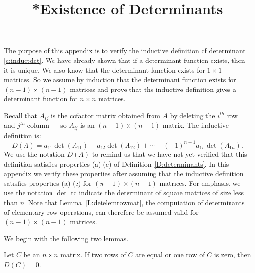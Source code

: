 \documentclass{ximera}
\title{*Existence of Determinants}
\begin{document}
\begin{abstract}
\end{abstract}
\maketitle


\label{A:det}

The purpose of this appendix is to verify the inductive
definition of determinant \eqref{e:inductdet}. We have already
shown that if a determinant function exists, then it is unique.
We also know that the determinant function exists for $1\times
1$ matrices. So we assume by induction that the determinant function
exists for $(n-1)\times(n-1)$ matrices and prove that the
inductive definition gives a determinant function for $n\times
n$ matrices.  

Recall that $A_{ij}$ is the cofactor matrix obtained from $A$ by
deleting the $i^{th}$ row and $j^{th}$ column --- so $A_{ij}$ is
an $(n-1)\times(n-1)$ matrix.  The inductive definition is:
  
\[
D(A) = a_{11}\det(A_{11})-a_{12}\det(A_{12})+\cdots 
+(-1)^{n+1}a_{1n}\det(A_{1n}).
\]
We use the notation $D(A)$ to remind us that we have not yet
verified that this definition satisfies properties (a)-(c) of
Definition~\ref{D:determinants}.  In this appendix we verify these
properties after assuming that the inductive definition
satisfies properties (a)-(c) for $(n-1)\times (n-1)$ matrices.
For emphasis, we use the notation $\det$ to indicate the
determinant of square matrices of size less than $n$.  Note 
that Lemma~\ref{L:detelemrowmat}, the computation of 
determinants of elementary row operations, can therefore 
be assumed valid for $(n-1)\times (n-1)$ matrices.

We begin with the following two lemmas.

\begin{lemma} \label{L:two_equal}
Let $C$ be an $n\times n$ matrix.  If two rows of  $C$ are equal 
or one row of $C$ is zero, then $D(C)=0$. 
\end{lemma}
\end{document}
